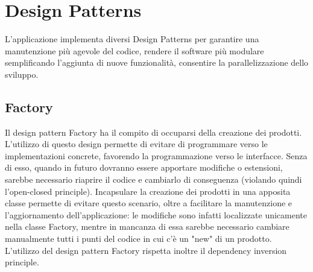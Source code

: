 \chapter{Design Patterns}

L'applicazione implementa diversi Design Patterns per garantire una manutenzione più agevole del codice, rendere il software più modulare semplificando l'aggiunta di nuove funzionalità, consentire la parallelizzazione dello sviluppo.

\section{Factory}

Il design pattern Factory ha il compito di occuparsi della creazione dei prodotti. L'utilizzo di questo design permette di evitare di programmare verso le implementazioni concrete, favorendo la programmazione verso le interfacce. Senza di esso, quando in futuro dovranno essere apportare modifiche o estensioni, sarebbe necessario riaprire il codice e cambiarlo di conseguenza (violando quindi l'open-closed principle). Incapsulare la creazione dei prodotti in una apposita classe permette di evitare questo scenario, oltre a facilitare la manutenzione e l'aggiornamento dell'applicazione: le modifiche sono infatti localizzate unicamente nella classe Factory, mentre in mancanza di essa sarebbe necessario cambiare manualmente tutti i punti del codice in cui c'è un "new" di un prodotto. L'utilizzo del design pattern Factory rispetta inoltre il dependency inversion principle. 

